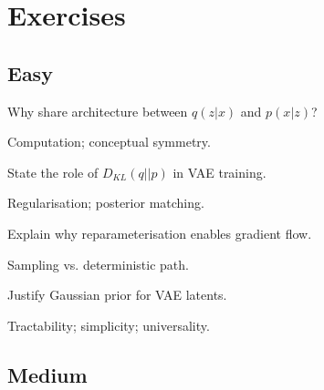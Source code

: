 
\section*{Exercises}

\subsection*{Easy}

\begin{exercisebox}[easy]
\begin{problem}
Why share architecture between $q(z|x)$ and $p(x|z)$?
\end{problem}
\begin{hintbox}
Computation; conceptual symmetry.
\end{hintbox}
\end{exercisebox}


\begin{exercisebox}[easy]
\begin{problem}[KL in ELBO]
State the role of $D_{KL}(q||p)$ in VAE training.
\end{problem}
\begin{hintbox}
Regularisation; posterior matching.
\end{hintbox}
\end{exercisebox}


\begin{exercisebox}[easy]
\begin{problem}
Explain why reparameterisation enables gradient flow.
\end{problem}
\begin{hintbox}
Sampling vs. deterministic path.
\end{hintbox}
\end{exercisebox}


\begin{exercisebox}[easy]
\begin{problem}
Justify Gaussian prior for VAE latents.
\end{problem}
\begin{hintbox}
Tractability; simplicity; universality.
\end{hintbox}
\end{exercisebox}


\subsection*{Medium}

